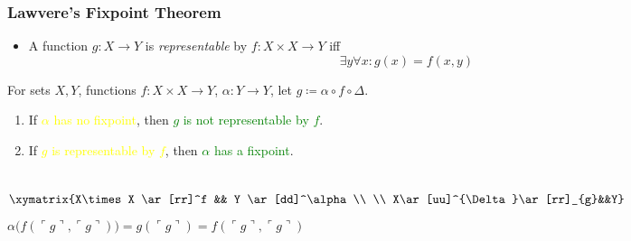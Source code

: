 \documentclass[UTF8,aspectratio=43,11pt,colorlinks,compress,openany]{beamer}%
\begin{document}
\begin{frame}\frametitle{Lawvere's Fixpoint Theorem}
	\begin{itemize}
		\item A function $g: X\to Y$ is \emph{representable} by $f: X\times X\to Y$ iff
		\[\exists y\forall x: g(x)=f(x,y)\]
	\end{itemize}
	\begin{theorem}
		For sets $X, Y$, functions $f: X\times X\to Y$, $\alpha: Y\to Y$, let $g\coloneqq \alpha\circ f\circ\Delta$.
		\begin{enumerate}
			\item If \textcolor{yellow}{$\alpha$ has no fixpoint}, then \textcolor{green}{$g$ is not representable by $f$}.
			\item If \textcolor{yellow}{$g$ is representable by $f$}, then \textcolor{green}{$\alpha$ has a fixpoint}.
		\end{enumerate}
	\end{theorem}
	\begin{columns}[onlytextwidth]
			\[\xymatrix{X\times X
				\ar[rr]^f && Y \ar[dd]^\alpha
				\\
				\\
				X\ar[uu]^{\Delta}\ar[rr]_{g}&&Y}\]
				$\alpha\big(f\left(\ulcorner g\urcorner,\ulcorner g\urcorner\right)\big)=g\left(\ulcorner g\urcorner\right)=f\left(\ulcorner g\urcorner,\ulcorner g\urcorner\right)$
	\end{columns}
\end{frame}
\end{document}
